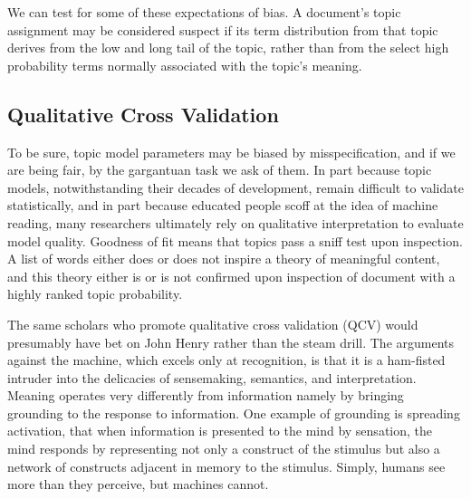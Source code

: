 \documentclass[]{book}
\theoremstyle{definition}
\theoremstyle{definition}
\theoremstyle{definition}
\theoremstyle{remark}
\begin{document}
We can test for some of these expectations of bias. A document's topic
assignment may be considered suspect if its term distribution from that
topic derives from the low and long tail of the topic, rather than from
the select high probability terms normally associated with the topic's
meaning.

\hypertarget{qualitative-cross-validation}{%
\subsection{Qualitative Cross
Validation}\label{qualitative-cross-validation}}

To be sure, topic model parameters may be biased by misspecification,
and if we are being fair, by the gargantuan task we ask of them. In part
because topic models, notwithstanding their decades of development,
remain difficult to validate statistically, and in part because educated
people scoff at the idea of machine reading, many researchers ultimately
rely on qualitative interpretation to evaluate model quality. Goodness
of fit means that topics pass a sniff test upon inspection. A list of
words either does or does not inspire a theory of meaningful content,
and this theory either is or is not confirmed upon inspection of
document with a highly ranked topic probability.

The same scholars who promote qualitative cross validation (QCV) would
presumably have bet on John Henry rather than the steam drill. The
arguments against the machine, which excels only at recognition, is that
it is a ham-fisted intruder into the delicacies of sensemaking,
semantics, and interpretation. Meaning operates very differently from
information namely by bringing grounding to the response to information.
One example of grounding is spreading activation, that when information
is presented to the mind by sensation, the mind responds by representing
not only a construct of the stimulus but also a network of constructs
adjacent in memory to the stimulus. Simply, humans see more than they
perceive, but machines cannot.
\end{document}
